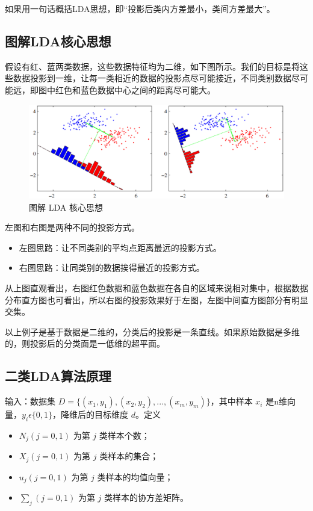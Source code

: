如果用一句话概括LDA思想，即``投影后类内方差最小，类间方差最大''。

\subsection{图解LDA核心思想}

假设有红、蓝两类数据，这些数据特征均为二维，如下图所示。我们的目标是将这些数据投影到一维，让每一类相近的数据的投影点尽可能接近，不同类别数据尽可能远，即图中红色和蓝色数据中心之间的距离尽可能大。

 \begin{figure}[h]
   \centering
   \includegraphics[width=.9\textwidth]{imgs/2.29.1.eps}
   \caption{图解 LDA 核心思想}
   \label{fig:2.29.1}
 \end{figure}

左图和右图是两种不同的投影方式。

\begin{itemize}
\itemsep0em
	\item 左图思路：让不同类别的平均点距离最远的投影方式。
	\item 右图思路：让同类别的数据挨得最近的投影方式。
\end{itemize}

从上图直观看出，右图红色数据和蓝色数据在各自的区域来说相对集中，根据数据分布直方图也可看出，所以右图的投影效果好于左图，左图中间直方图部分有明显交集。

以上例子是基于数据是二维的，分类后的投影是一条直线。如果原始数据是多维的，则投影后的分类面是一低维的超平面。

\subsection{二类LDA算法原理}

输入：数据集 $D=\{( x_1, y_1),( x_2, y_2),...,( x_m, y_m)\}$，其中样本 $ x_i $ 是n维向量，$ y_i  \epsilon \{0, 1\}$，降维后的目标维度 $d$。定义

\begin{itemize}
	\itemsep0em
	\item	$N_j(j=0,1)$ 为第 $j$ 类样本个数；
	\item	$X_j(j=0,1)$ 为第 $j$ 类样本的集合；
	\item	$u_j(j=0,1)$ 为第 $j$ 类样本的均值向量；
	\item	$\sum_j(j=0,1)$ 为第 $j$ 类样本的协方差矩阵。
\end{itemize}

